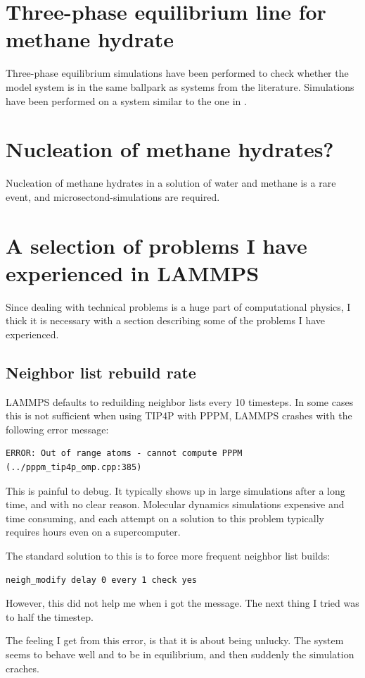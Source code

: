 \section{Three-phase equilibrium line for methane hydrate}
Three-phase equilibrium simulations have been performed to check whether the model system is in the same ballpark as systems from the literature. Simulations have been performed on a system similar to the one in \cite{Conde2010}.

\section{Nucleation of methane hydrates?}
Nucleation of methane hydrates in a solution of water and methane is a rare event, and microsectond-simulations are required. 


\section{A selection of problems I have experienced in LAMMPS}

Since dealing with technical problems is a huge part of computational physics, I thick it is necessary with a section describing some of the problems I have experienced.

\subsection{Neighbor list rebuild rate}
LAMMPS defaults to reduilding neighbor lists every 10 timesteps. In some cases this is not sufficient when using TIP4P with PPPM, LAMMPS crashes with the following error message:

\begin{verbatim}
ERROR: Out of range atoms - cannot compute PPPM (../pppm_tip4p_omp.cpp:385)
\end{verbatim}

This is painful to debug. It typically shows up in large simulations after a long time, and with no clear reason. Molecular dynamics simulations expensive and time consuming, and each attempt on a solution to this problem typically requires hours even on a supercomputer. 

The standard solution to this is to force more frequent neighbor list builds:

\begin{lstlisting}[language=LammpsInput]
neigh_modify delay 0 every 1 check yes
\end{lstlisting}

However, this did not help me when i got the message. The next thing I tried was to half the timestep.

The feeling I get from this error, is that it is about being unlucky. The system seems to behave well and to be in equilibrium, and then suddenly the simulation craches.